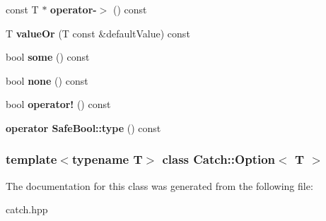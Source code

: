 \begin{DoxyCompactItemize}
\item 
\hypertarget{classCatch_1_1Option_a0800340b2971748671b88acfb14bb928}{
const T $\ast$ {\bfseries operator-\/$>$} () const }
\label{classCatch_1_1Option_a0800340b2971748671b88acfb14bb928}

\item 
\hypertarget{classCatch_1_1Option_a21b5629a7febbe3e23c475c9d9138a2d}{
T {\bfseries valueOr} (T const \&defaultValue) const }
\label{classCatch_1_1Option_a21b5629a7febbe3e23c475c9d9138a2d}

\item 
\hypertarget{classCatch_1_1Option_affa96f15798b4656fb753ff52d12dec2}{
bool {\bfseries some} () const }
\label{classCatch_1_1Option_affa96f15798b4656fb753ff52d12dec2}

\item 
\hypertarget{classCatch_1_1Option_a389324d2aa20ceb0eb0f48a5f77c20c8}{
bool {\bfseries none} () const }
\label{classCatch_1_1Option_a389324d2aa20ceb0eb0f48a5f77c20c8}

\item 
\hypertarget{classCatch_1_1Option_a47a1b6f6def2730ea9d27a1860a4f97f}{
bool {\bfseries operator!} () const }
\label{classCatch_1_1Option_a47a1b6f6def2730ea9d27a1860a4f97f}

\item 
\hypertarget{classCatch_1_1Option_a637d4366ae7f0ded52ce59c8cb06da7b}{
{\bfseries operator SafeBool::type} () const }
\label{classCatch_1_1Option_a637d4366ae7f0ded52ce59c8cb06da7b}

\end{DoxyCompactItemize}
\subsubsection*{template$<$typename T$>$ class Catch::Option$<$ T $>$}



The documentation for this class was generated from the following file:\begin{DoxyCompactItemize}
\item 
catch.hpp\end{DoxyCompactItemize}
